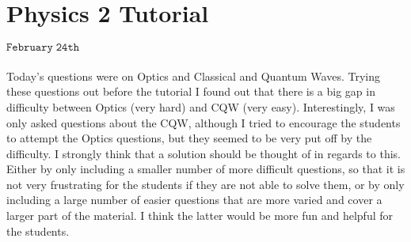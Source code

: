 \section{Physics 2 Tutorial}
\begin{flushright}
$\mathtt{February \; 24th}$
\end{flushright}
\paragraph{}

Today's questions were on Optics and Classical and Quantum Waves. Trying these questions out before the tutorial I found out that there is a big gap in difficulty between Optics (very hard) and CQW (very easy). Interestingly, I was only asked questions about the CQW, although I tried to encourage the students to attempt the Optics questions, but they seemed to be very put off by the difficulty. I strongly think that a solution should be thought of in regards to this. Either by only including a smaller number of more difficult questions, so that it is not very frustrating for the students if they are not able to solve them, or by only including a large number of easier questions that are more varied and cover a larger part of the material. I think the latter would be more fun and helpful for the students.
